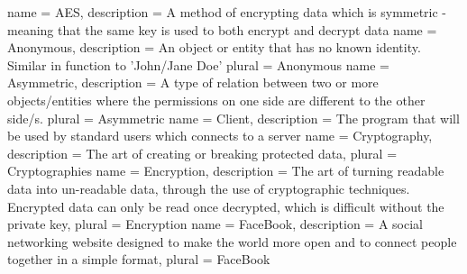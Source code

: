 
{
    name = AES,
    description = {A method of encrypting data which is symmetric - meaning
                   that the same key is used to both encrypt and decrypt data}
}
{
    name = Anonymous,
    description = {An object or entity that has no known identity.  Similar in
                   function to 'John/Jane Doe'}
    plural = Anonymous
}
{
    name = Asymmetric,
    description = {A type of relation between two or more objects/entities where
                   the permissions on one side are different to the other
                   side/s.}
    plural = Asymmetric
}
{
    name = Client,
    description = {The program that will be used by standard users which
                   connects to a server}
}
{
    name = Cryptography,
    description = {The art of creating or breaking protected data},
    plural = Cryptographies
}
{
    name = Encryption,
    description = {The art of turning readable data into un-readable data,
                   through the use of cryptographic techniques.  Encrypted data
                   can only be read once decrypted, which is difficult without
                   the private key},
    plural = Encryption
}
{
    name = FaceBook,
    description = {A social networking website designed to make the world more
                   open and to connect people together in a simple format},
    plural = FaceBook
}

